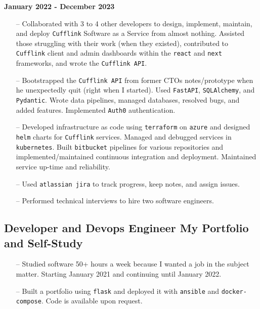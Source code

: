\documentclass{article}
\begin{document}
\textbf{January 2022 - December 2023}

\begin{itemize}
\tightlist
\item[--]
  Collaborated with 3 to 4 other developers to design, implement, maintain,
  and deploy \texttt{Cufflink} Software as a Service from almost nothing. Assisted those struggling with their work (when they existed), contributed to \texttt{Cufflink} client and admin dashboards within the \texttt{react} and \texttt{next} frameworks, and wrote the \texttt{Cufflink API}.
\item[--]
  Bootstrapped the \texttt{Cufflink API} from former CTOs notes/prototype when
  he unexpectedly quit (right when I started). Used \texttt{FastAPI}, \texttt{SQLAlchemy}, and \texttt{Pydantic}. Wrote data pipelines, managed databases, resolved bugs, and added features. Implemented \texttt{Auth0} authentication.
\item[--]
  Developed infrastructure as code using \texttt{terraform} on \texttt{azure} and designed \texttt{helm} charts for \texttt{Cufflink} services. Managed and debugged services in \texttt{kubernetes}. Built \texttt{bitbucket} pipelines for various repositories and implemented/maintained
  continuous integration and deployment. Maintained service up-time and reliability.
\item[--]
  Used \texttt{atlassian jira} to track progress, keep notes, and assign issues.
\item[--]
  Performed technical interviews to hire two software engineers.
\end{itemize}

\subsection*{Developer and Devops Engineer \textbar{} My Portfolio and
Self-Study}\label{developer-and-devops-engineer-my-portfolio-and-self-study}

\begin{itemize}
\tightlist
\item[--]
  Studied software 50+ hours a week because I wanted a job in the subject matter. Starting January 2021 and continuing until January
  2022.
\item[--]
  Built a portfolio using \texttt{flask} and deployed it with
  \texttt{ansible} and \texttt{docker-compose}. Code is available upon request.
\end{itemize}
\end{document}
